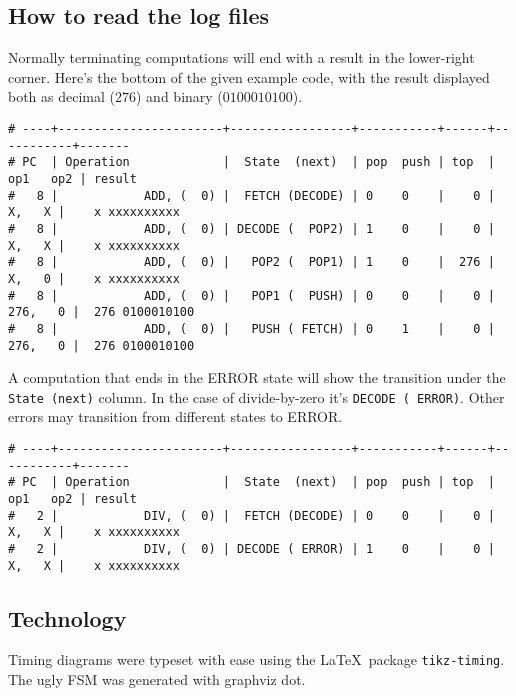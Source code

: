 \documentclass{article}
\begin{document}
\subsection{How to read the log files}
Normally terminating computations will end with a result in the lower-right corner.
Here's the bottom of the given example code, with the result displayed both
as decimal ($276$) and binary ($0100010100$).
\begin{verbatim}
# ----+-----------------------+-----------------+-----------+------+-----------+-------
# PC  | Operation             |  State  (next)  | pop  push | top  | op1   op2 | result
#   8 |            ADD, (  0) |  FETCH (DECODE) | 0    0    |    0 |    X,   X |    x xxxxxxxxxx
#   8 |            ADD, (  0) | DECODE (  POP2) | 1    0    |    0 |    X,   X |    x xxxxxxxxxx
#   8 |            ADD, (  0) |   POP2 (  POP1) | 1    0    |  276 |    X,   0 |    x xxxxxxxxxx
#   8 |            ADD, (  0) |   POP1 (  PUSH) | 0    0    |    0 |  276,   0 |  276 0100010100
#   8 |            ADD, (  0) |   PUSH ( FETCH) | 0    1    |    0 |  276,   0 |  276 0100010100
\end{verbatim}

A computation that ends in the ERROR state will show the transition under the \verb'State (next)' column.
In the case of divide-by-zero it's \verb'DECODE ( ERROR)'.
Other errors may transition from different states to ERROR.
\begin{verbatim}
# ----+-----------------------+-----------------+-----------+------+-----------+-------
# PC  | Operation             |  State  (next)  | pop  push | top  | op1   op2 | result
#   2 |            DIV, (  0) |  FETCH (DECODE) | 0    0    |    0 |    X,   X |    x xxxxxxxxxx
#   2 |            DIV, (  0) | DECODE ( ERROR) | 1    0    |    0 |    X,   X |    x xxxxxxxxxx
\end{verbatim}


\subsection{Technology}
Timing diagrams were typeset with ease using the \LaTeX\ package \verb'tikz-timing'.
The ugly FSM was generated with graphviz dot.
\end{document}
